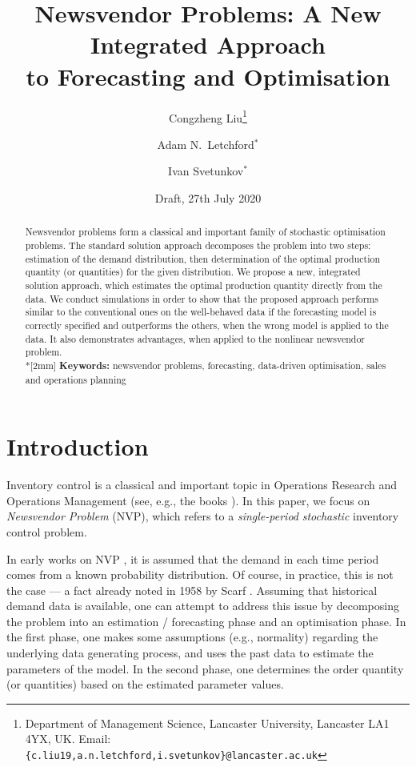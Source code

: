 \documentclass{article}
\title{Newsvendor Problems: A New Integrated Approach\\ to Forecasting and Optimisation}
\author{Congzheng Liu\thanks{Department of Management Science,
Lancaster University, Lancaster LA1 4YX, UK.
Email: {\tt \{c.liu19,a.n.letchford,i.svetunkov\}@lancaster.ac.uk}}
\and Adam N.\ Letchford$^*$ \and Ivan Svetunkov$^*$} %
\date{Draft, 27th July 2020}
\begin{document}
\maketitle

\begin{abstract}
Newsvendor problems form a classical and important family of stochastic optimisation problems. The standard solution approach decomposes the problem into two steps: estimation of the demand distribution, then determination of the optimal production quantity (or quantities) for the given distribution. We propose a new, integrated solution approach, which estimates the optimal production quantity directly from the data. We conduct simulations in order to show that the proposed approach performs similar to the conventional ones on the well-behaved data if the forecasting model is correctly specified and outperforms the others, when the wrong model is applied to the data. It also demonstrates advantages, when applied to the nonlinear newsvendor problem.%
\\*[2mm]
{\bf Keywords:} newsvendor problems, forecasting, data-driven optimisation, sales and operations planning
\end{abstract}


\section{Introduction}

Inventory control is a classical and important topic in Operations Research and Operations Management (see, e.g., the books \cite{Po02,SPP98,Zi00}). In this paper, we focus on \emph{Newsvendor Problem} (NVP), which refers to a \emph{single-period} \emph{stochastic} inventory control problem.

In early works on NVP \cite{AHM51,MK51}, it is assumed that the demand in each time period comes from a known probability distribution. Of course, in practice, this is not the case --- a fact already noted in 1958 by Scarf \cite{Sc58}. Assuming that historical demand data is available, one can attempt to address this issue by decomposing the problem into an estimation / forecasting phase and an optimisation phase.
In the first phase, one makes some assumptions (e.g., normality) regarding the underlying data generating process, and uses the past data to estimate the parameters of the model.
In the second phase, one determines the order quantity (or quantities) based on the estimated parameter values.
\end{document}
